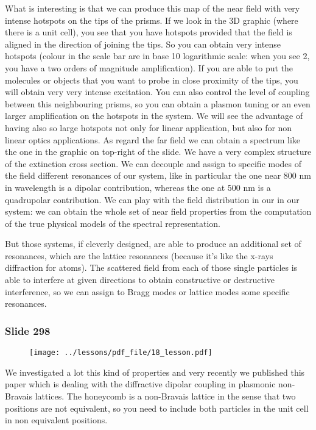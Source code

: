 \documentclass[../main/main.tex]{subfiles}
\begin{document}
What is interesting is that we can produce this map of the near field with very intense hotspots on the tips of the prisms.
If we look in the 3D graphic (where there is a unit cell), you see that you have hotspots provided that the field is aligned in the direction of joining the tips. So you can obtain very intense hotspots (colour in the scale bar are in base 10 logarithmic scale: when you see 2, you have a two orders of magnitude amplification).
If you are able to put the molecules or objects that you want to probe in close proximity of the tips, you will obtain very very intense excitation.
You can also control the level of coupling between this neighbouring prisms, so you can obtain a plasmon tuning or an even larger amplification on the hotspots in the system. We will see the advantage of having also so large hotspots not only for linear application, but also for non linear optics applications.
As regard the far field we can obtain a spectrum like the one in the graphic on top-right of the slide. We have a very complex structure of the extinction cross section. 
We can decouple and assign to specific modes of the field different resonances of our system, like in particular the one near 800 nm in wavelength is a dipolar contribution, whereas the one at 500 nm is a quadrupolar contribution. 
We can play with the field distribution in our in our system: we can obtain the whole set of near field properties from the computation of the true physical models of the spectral representation.

But those systems, if cleverly designed, are able to produce an additional set of resonances, which are the  lattice resonances (because it's like the x-rays diffraction for atoms).
The scattered field from each of those single particles is able to interfere at given directions to obtain constructive or destructive interference, so we can assign to Bragg modes or lattice modes some specific resonances.

\newpage

\subsubsection{Slide 298}

\begin{figure}[h!]
\centering
\texttt{[image: ../lessons/pdf\_file/18\_lesson.pdf]}
\end{figure}

We investigated a lot this kind of properties and very recently we published this paper which is dealing with the diffractive dipolar coupling in plasmonic non-Bravais lattices. 
The honeycomb is a non-Bravais lattice in the sense that two positions are not equivalent, so you need to include both particles in the unit cell in non equivalent positions. 
\end{document}
